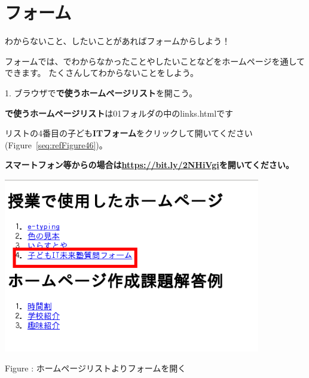 \documentclass[a4paper,12pt]{jarticle}
\begin{document}
\section{フォーム}
わからないこと、したいことがあればフォームからしよう！

フォームでは、でわからなかったことやしたいことなどをホームページを通してできます。
たくさんしてわからないことをしよう。

1.
ブラウザで\textbf{で使うホームページリスト}を開こう。

\textbf{で使うホームページリスト}は01フォルダの中のlinks.htmlです

リストの4番目の子ども\textbf{ITフォーム}をクリックして開いてください(Figure~\ref{seq:refFigure46})。


\bigskip

{\bfseries
  スマートフォン等からの場合は\url{https://bit.ly/2NHiVgi}を開いてください。}



\centering
\begin{minipage}{9.781cm}
  {\upshape
    \includegraphics[width=11.231cm,height=7.613cm]{textbook-img245.png}
    \flushleft

    \bigskip
    Figure {\theFigure\label{seq:refFigure46}}:
    ホームページリストよりフォームを開く}
\end{minipage}

\bigskip

\bigskip
\end{document}
